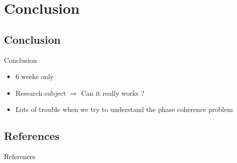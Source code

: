 \documentclass{bredelebeamer}
\begin{document}
\section{Conclusion}
\subsection{Conclusion}
\begin{frame}{Conclusion}{}
\begin{itemize}
\item 6 weeks only
\item Research subject $\Rightarrow$ Can it really works ?
\item Lots of trouble when we try to understand the phase coherence problem
\end{itemize}
\end{frame}
\subsection{References}
\begin{frame}{References}{}

\end{frame}
\end{document}
